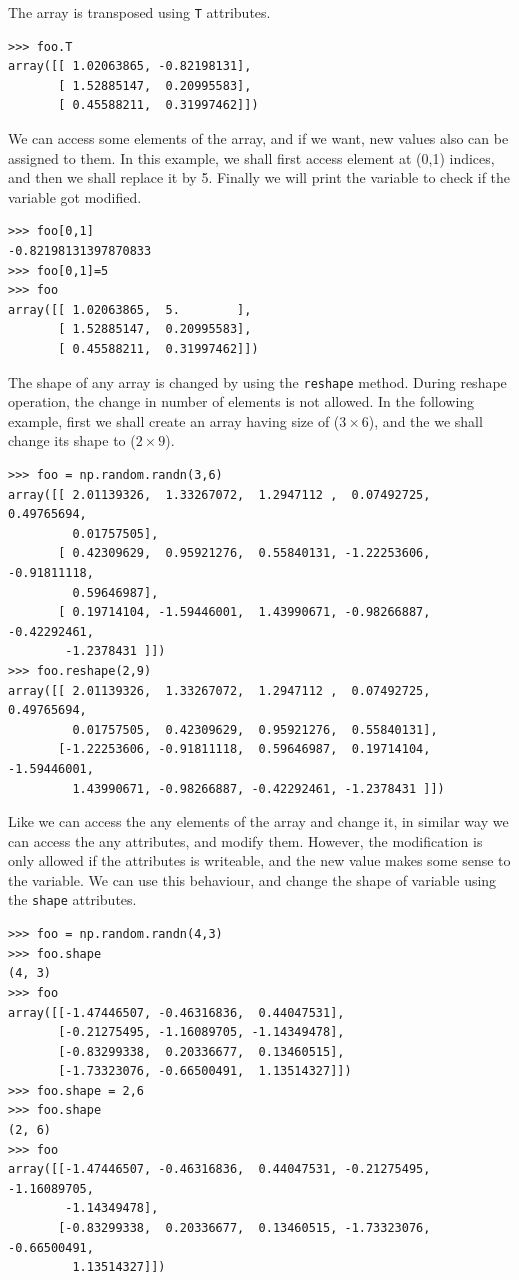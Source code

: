 \documentclass[10pt]{book}
\begin{document}
{The array is transposed using \verb"T" attributes. 
\beforeverb \begin{verbatim}
>>> foo.T
array([[ 1.02063865, -0.82198131],
       [ 1.52885147,  0.20995583],
       [ 0.45588211,  0.31997462]])
\end{verbatim} \afterverb

We can access some elements of the array, and if we want, new values also can be assigned to them. In this example, we shall first access element at (0,1) indices, and then we shall replace it by 5. Finally we will print the variable to check if the variable got modified.
\beforeverb \begin{verbatim}
>>> foo[0,1]
-0.82198131397870833
>>> foo[0,1]=5
>>> foo
array([[ 1.02063865,  5.        ],
       [ 1.52885147,  0.20995583],
       [ 0.45588211,  0.31997462]])
\end{verbatim} \afterverb

The shape of any array is changed by using the \verb"reshape" method. During reshape operation, the change in number of elements is not allowed. In the following example, first we shall create an array having size of ($3 \times 6$), and the we shall change its shape to ($2 \times 9$). 
\beforeverb \begin{verbatim}
>>> foo = np.random.randn(3,6)
array([[ 2.01139326,  1.33267072,  1.2947112 ,  0.07492725,  0.49765694,
         0.01757505],
       [ 0.42309629,  0.95921276,  0.55840131, -1.22253606, -0.91811118,
         0.59646987],
       [ 0.19714104, -1.59446001,  1.43990671, -0.98266887, -0.42292461,
        -1.2378431 ]])
>>> foo.reshape(2,9)
array([[ 2.01139326,  1.33267072,  1.2947112 ,  0.07492725,  0.49765694,
         0.01757505,  0.42309629,  0.95921276,  0.55840131],
       [-1.22253606, -0.91811118,  0.59646987,  0.19714104, -1.59446001,
         1.43990671, -0.98266887, -0.42292461, -1.2378431 ]])
\end{verbatim}
\afterverb

Like we can access the any elements of the array and change it, in similar way we can access the any attributes, and modify them. However, the modification is only allowed if the attributes is writeable, and the new value makes some sense to the variable. We can use this behaviour, and change the shape of variable using the \verb"shape" attributes. 
\beforeverb \begin{verbatim}
>>> foo = np.random.randn(4,3)
>>> foo.shape
(4, 3)
>>> foo
array([[-1.47446507, -0.46316836,  0.44047531],
       [-0.21275495, -1.16089705, -1.14349478],
       [-0.83299338,  0.20336677,  0.13460515],
       [-1.73323076, -0.66500491,  1.13514327]])
>>> foo.shape = 2,6
>>> foo.shape
(2, 6)
>>> foo
array([[-1.47446507, -0.46316836,  0.44047531, -0.21275495, -1.16089705,
        -1.14349478],
       [-0.83299338,  0.20336677,  0.13460515, -1.73323076, -0.66500491,
         1.13514327]])
\end{verbatim} \afterverb

}
\end{document}
